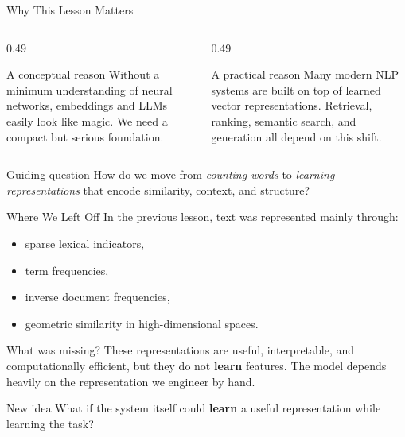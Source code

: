 \documentclass[11pt,aspectratio=169,professionalfonts]{beamer}
\begin{document}
%
%
\begin{frame}{Why This Lesson Matters}
\begin{columns}[T]
\begin{column}{0.49\textwidth}
\begin{block}{A conceptual reason}
Without a minimum understanding of neural networks, embeddings and LLMs easily look like magic. We need a compact but serious foundation.
\end{block}
\end{column}
\begin{column}{0.49\textwidth}
\begin{block}{A practical reason}
Many modern NLP systems are built on top of learned vector representations. Retrieval, ranking, semantic search, and generation all depend on this shift.
\end{block}
\end{column}
\end{columns}

\vspace{0.2cm}
\begin{alertblock}{Guiding question}
How do we move from \emph{counting words} to \emph{learning representations} that encode similarity, context, and structure?
\end{alertblock}
\end{frame}
%
%
\begin{frame}{Where We Left Off}
In the previous lesson, text was represented mainly through:
\begin{itemize}
    \item sparse lexical indicators,
    \item term frequencies,
    \item inverse document frequencies,
    \item geometric similarity in high-dimensional spaces.
\end{itemize}

\vspace{0.2cm}
\begin{block}{What was missing?}
These representations are useful, interpretable, and computationally efficient, but they do not \textbf{learn} features. The model depends heavily on the representation we engineer by hand.
\end{block}

\vspace{0.1cm}
\begin{alertblock}{New idea}
What if the system itself could \textbf{learn} a useful representation while learning the task?
\end{alertblock}
\end{frame}
\end{document}
